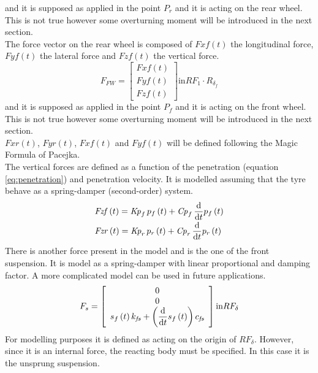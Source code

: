 and it is supposed as applied in the point $P_r$ and it is acting on the rear wheel. This is not true however some overturning moment will be introduced in the next section.\\
The force vector on the rear wheel is composed of $Fxf(t)$ the longitudinal force, $Fyf(t)$ the lateral force and $Fzf(t)$ the vertical force.
%
\begin{equation}
    F_{FW} = 
    \left[
    \begin{array}{c}
        Fxf(t)\\
        Fyf(t)\\
        Fzf(t)
    \end{array}
    \right ]
    \text{in} RF_1 \cdot R_{\delta_f}
\end{equation}
%
and it is supposed as applied in the point $P_f$ and it is acting on the front wheel. This is not true however some overturning moment will be introduced in the next section.\\
$Fxr(t)$, $Fyr(t)$, $Fxf(t)$ and $Fyf(t)$ will be defined following the Magic Formula of Pacejka\cite{pacejka2006tyre}.\\
The vertical forces are defined as a function of the penetration (equation \ref{eq:penetration}) and penetration velocity. It is modelled assuming that the tyre behave as a spring-damper (second-order) system.
%
\begin{equation}
\begin{array}{l} 
\displaystyle {\it Fzf} \left( t \right) ={\it Kp}_{f}\,p_
{f} \left( t \right) +{\it Cp}_{f}\,{\frac {\rm d}{{\rm d}t}}p_{f}
\left( t \right) \\[6pt]
\displaystyle {\it Fzr} \left( t \right) ={
\it Kp}_{r}\,p_{r} \left( t \right) +{\it Cp}_{r}\,{\frac {\rm d}{
{\rm d}t}}p_{r} \left( t \right) 
\end{array} 
\end{equation}
%
There is another force present in the model and is the one of the front suspension. It is model as a spring-damper with linear proportional and damping factor. A more complicated model can be used in future applications.
%
\begin{equation}
    F_{s} = 
    \left[
    \begin{array}{c}
        0\\
        0\\
        \displaystyle s_{f} \left( t \right) k_{{\it fs}}+ \left( {\frac {\rm d}{{\rm d}t}}s_{f} \left( t \right)  \right) c_{{\it fs}}
    \end{array}
    \right ]
    \text{in} RF_\delta
\end{equation}
%
For modelling purposes it is defined as acting on the origin of $RF_\delta$. However, since it is an internal force, the reacting body must be specified. In this case it is the unsprung suspension.
%
